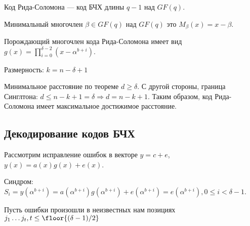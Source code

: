 \begin{definition}
    Код Рида-Соломона --- код БЧХ длины \(q - 1\) над \(GF(q)\).
\end{definition}

Минимальный многочлен \(\beta \in GF(q)\) над \(GF(q)\) это
\(M_\beta(x) = x - \beta\).

Порождающий многочлен кода Рида-Соломона имеет вид
\(g(x) = \prod_{i = 0}^{\delta - 2} (x - \alpha^{b + i})\).

Размерность: \(k = n - \delta + 1\)

Минимальное расстояние по теореме \(d \geq \delta\).
С другой стороны, граница Синглтона:
\(d \leq n - k + 1 = \delta \Rightarrow d = n - k + 1\).
Таким образом, код Рида-Соломона имеет максимальное достижимое расстояние.

\subsection{Декодирование кодов БЧХ}

Рассмотрим исправление ошибок в векторе \(y = c + e\),
\(y(x) = a(x)g(x) + e(x)\).

Синдром: \(S_i = y(\alpha^{b + i})
= a(\alpha^{b + i})g(\alpha^{b + i}) + e(\alpha^{b + i}) = e(\alpha^{b + i}),
0 \leq i < \delta - 1\).

Пусть ошибки произошли в неизвестных нам позициях \(j_1 \dots j_t,
t \leq \floor{(\delta - 1) / 2}\) 

\unfinished